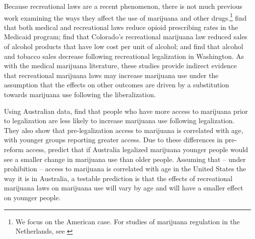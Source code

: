 \documentclass[12pt]{article}%
\begin{document}
Because recreational laws are a recent phenomenon, there is not much previous work examining the ways they affect the use of marijuana and other drugs.\footnote{We focus on the American case. For studies of marijuana regulation in the Netherlands, see \citep{Korf1995, Monshouwer2004, MacCoun2001,MacCoun2010}} 
\citet{Wen2018} find that both medical and recreational laws reduce opioid prescribing rates in the Medicaid program;  \citet{Hollingsworth2019} find that Colorado’s recreational marijuana law reduced sales of alcohol products that have low cost per unit of alcohol; and \citet{Miller2018} find that alcohol and tobacco sales decrease following recreational legalization in Washington. 
As with the medical marijuana literature, these studies provide indirect evidence that recreational marijuana laws may increase marijuana use under the assumption that the effects on other outcomes are driven by a substitution towards marijuana use following the liberalization. 

Using Australian data, \citet{Jacobi2016} find that people who have more access to marijuana prior to legalization are less likely to increase marijuana use following legalization. 
They also show that pre-legalization access to marijuana is correlated with age, with younger groups reporting greater access. 
Due to these differences in pre-reform access, \citet{Jacobi2016} predict that if Australia legalized marijuana younger people would see a smaller change in marijuana use than older people. Assuming that -- under prohibition -- access to marijuana is correlated with age in the United States the way it is in Australia, a testable prediction is that the effects of recreational marijuana laws on marijuana use will vary by age and will have a smaller effect on younger people. 
\end{document}
